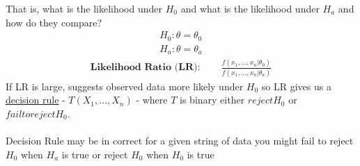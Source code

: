 That is, what is the likelihood under $H_0$ and what is the likelihood under $H_a$ and how do they compare?
\begin{gather*}
	H_0: \theta = \theta_0\\
		H_a: \theta = \theta_a
\end{gather*}
\begin{gather*}
	\textbf{Likelihood Ratio (LR)}: \qquad \frac{f(x_1, \ldots, x_n | \theta_0)}{f(x_1, \ldots, x_n | \theta_a)}
\end{gather*}
If LR is large, suggests observed data more likely under $H_0$ so LR gives us a \underline{decision rule} - $T(X_1, \ldots, X_n)$ - where $T$ is binary either $reject H_0$ or $fail to reject H_0$.\\\\
Decision Rule may be in correct for a given string of data you might fail to reject $H_0$ when $H_a$ is true or reject $H_0$ when $H_0$ is true
